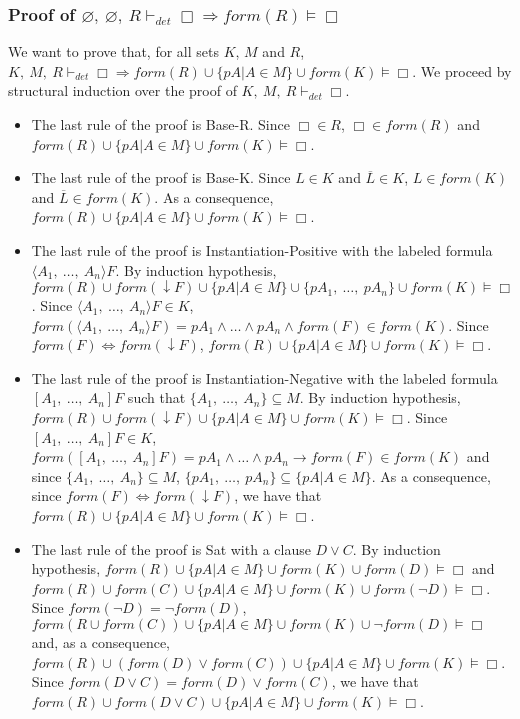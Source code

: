 \documentclass[a4paper,10pt]{article}
\newcommand{\dett}{\vdash_\mathit{det}}
\newcommand{\F}{\mathit{form}}
\begin{document}
\subsubsection*{Proof of $\varnothing,\ \varnothing,\ R\dett\Box\Rightarrow\F(R)\vDash\Box$}
We want to prove that, for all sets $K$, $M$ and $R$, $K,\ M,\ R\dett\Box\Rightarrow
\F(R)\cup\{pA|A\in M\}\cup\F(K)\vDash\Box$. We proceed by structural induction over the proof of
$K,\ M,\ R\dett\Box$.
\begin{itemize}
 \item The last rule of the proof is {\sc Base-R}. Since $\Box\in R$,
$\Box\in\F(R)$ and $\F(R)\cup\{pA|A\in M\}\cup\F(K)\vDash\Box$.
 \item The last rule of the proof is {\sc Base-K}. Since $L\in K$ and $\overline L\in K$,
$L\in \F(K)$ and $\overline L\in\F(K)$. As a consequence, $\F(R)\cup\{pA|A\in M\}\cup\F(K)\vDash\Box$.
 \item The last rule of the proof is {\sc Instantiation-Positive} with the labeled formula
$\langle A_1,\ \dots,\ A_n\rangle F$. By induction hypothesis,
$\F(R)\cup \F(\downarrow F)\cup \{pA|A\in M\}\cup\{pA_1,\ \dots,\ pA_n\}\cup \F(K)\vDash\Box$.
Since $\langle A_1,\ \dots,\ A_n\rangle F\in K$, $\F(\langle A_1,\ \dots,\ A_n\rangle F)=
pA_1\wedge\dots\wedge pA_n\wedge\F(F)\in \F(K)$. Since $\F(F)\Leftrightarrow\F(\downarrow F)$,
$\F(R)\cup\{pA|A\in M\}\cup\F(K)\vDash\Box$.
 \item The last rule of the proof is {\sc Instantiation-Negative} with the labeled formula
$[A_1,\ \dots,\ A_n]F$ such that $\{A_1,\ \dots,\ A_n\}\subseteq M$. By induction hypothesis,
$\F(R)\cup \F(\downarrow F)\cup \{pA|A\in M\}\cup \F(K)\vDash\Box$.
Since $[A_1,\ \dots,\ A_n]F\in K$,
$\F([A_1,\ \dots,\ A_n]F)=pA_1\wedge\dots\wedge pA_n\rightarrow \F(F)\in \F(K)$ and since
$\{A_1,\ \dots,\ A_n\}\subseteq M$, $\{pA_1,\ \dots,\ pA_n\}\subseteq\{pA|A\in M\}$.
As a consequence, since $\F(F)\Leftrightarrow\F(\downarrow F)$,
we have that $\F(R)\cup\{pA|A\in M\}\cup\F(K)\vDash\Box$.
 \item The last rule of the proof is {\sc Sat} with a clause $D\vee C$.
By induction hypothesis,
$\F(R)\cup\{pA|A\in M\}\cup\F(K)\cup\F(D)\vDash\Box$ and
$\F(R)\cup\F(C)\cup\{pA|A\in M\}\cup\F(K)\cup\F(\neg D)\vDash\Box$. Since
$\F(\neg D)=\neg\F(D)$,  $\F(R\cup\F(C))\cup\{pA|A\in M\}\cup\F(K)\cup\neg\F(D)\vDash\Box$ and,
as a consequence, $\F(R)\cup(\F(D)\vee\F(C))\cup\{pA|A\in M\}\cup\F(K)\vDash\Box$.
Since $\F(D\vee C)=\F(D)\vee\F(C)$, we have that
$\F(R)\cup\F(D\vee C)\cup\{pA|A\in M\}\cup\F(K)\vDash\Box$.
\end{itemize}
\end{document}
